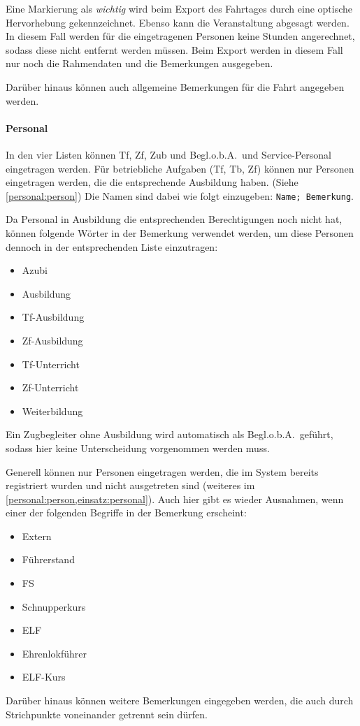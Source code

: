Eine Markierung als \emph{wichtig} wird beim Export des Fahrtages durch eine optische Hervorhebung gekennzeichnet.
Ebenso kann die Veranstaltung abgesagt werden.
In diesem Fall werden für die eingetragenen Personen keine Stunden angerechnet, sodass diese nicht entfernt werden müssen.
Beim Export werden in diesem Fall nur noch die Rahmendaten und die Bemerkungen ausgegeben.

Darüber hinaus können auch allgemeine Bemerkungen für die Fahrt angegeben werden.


\paragraph{Personal}
In den vier Listen können Tf, Zf, Zub und Begl.o.b.A.\ und Service-Personal eingetragen werden.
Für betriebliche Aufgaben (Tf, Tb, Zf) können nur Personen eingetragen werden, die die entsprechende Ausbildung haben.
(Siehe \cref{personal:person})
Die Namen sind dabei wie folgt einzugeben: \texttt{Name; Bemerkung}.

Da Personal in Ausbildung die entsprechenden Berechtigungen noch nicht hat, können folgende Wörter in der Bemerkung verwendet werden, um diese Personen dennoch in der entsprechenden Liste einzutragen:
\begin{itemize}
	\item Azubi
	\item Ausbildung
	\item Tf-Ausbildung
	\item Zf-Ausbildung
	\item Tf-Unterricht
	\item Zf-Unterricht
	\item Weiterbildung
\end{itemize}
Ein Zugbegleiter ohne Ausbildung wird automatisch als Begl.o.b.A.\ geführt, sodass hier keine Unterscheidung vorgenommen werden muss.

Generell können nur Personen eingetragen werden, die im System bereits registriert wurden und nicht ausgetreten sind
(weiteres im \cref{personal:person,einsatz:personal}).
Auch hier gibt es wieder Ausnahmen, wenn einer der folgenden Begriffe in der Bemerkung erscheint:
\begin{itemize}
	\item Extern
	\item Führerstand
	\item FS
	\item Schnupperkurs
	\item ELF
	\item Ehrenlokführer
	\item ELF-Kurs
\end{itemize}
Darüber hinaus können weitere Bemerkungen eingegeben werden, die auch durch Strichpunkte voneinander getrennt sein dürfen.

